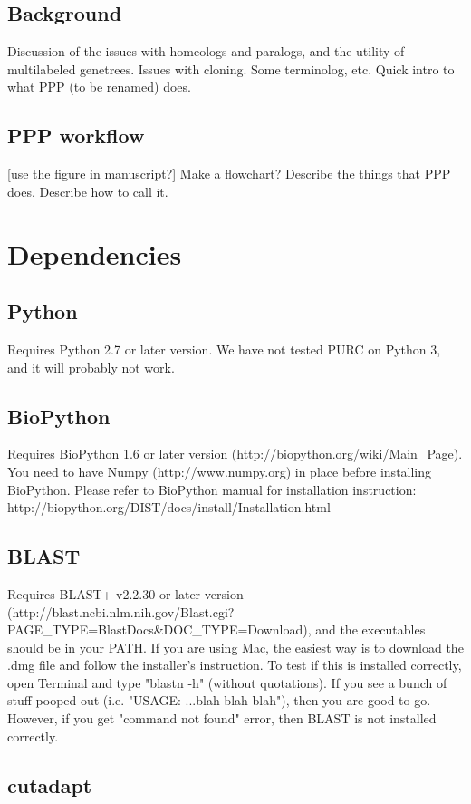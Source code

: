\documentclass[12pt,letterpaper]{article}
\begin{document}
\subsection{Background} 
Discussion of the issues with homeologs and paralogs, and the utility of 
multilabeled genetrees. Issues with cloning. Some terminolog, etc.
Quick intro to what PPP (to be renamed) does.

\subsection{PPP workflow}
[use the figure in manuscript?] Make a flowchart? Describe the things that PPP does.
Describe how to call it.

\bigskip\section{Dependencies} %
\subsection{Python}
Requires Python 2.7 or later version. We have not tested PURC on Python 3, and it will probably not work. 

\subsection{BioPython}
Requires BioPython 1.6 or later version (http://biopython.org/wiki/Main_Page). You need to have Numpy (http://www.numpy.org) in place before installing BioPython. Please refer to BioPython manual for installation instruction: http://biopython.org/DIST/docs/install/Installation.html

\subsection{BLAST}
Requires BLAST+ v2.2.30 or later version (http://blast.ncbi.nlm.nih.gov/Blast.cgi?PAGE_TYPE=BlastDocs&DOC_TYPE=Download), and the executables should be in your PATH. If you are using Mac, the easiest way is to download the .dmg file and follow the installer's instruction. To test if this is installed correctly, open Terminal and type "blastn -h" (without quotations). If you see a bunch of stuff pooped out (i.e. "USAGE: ...blah blah blah"), then you are good to go. However, if you get "command not found" error, then BLAST is not installed correctly.  

\subsection{cutadapt}
\end{document}
